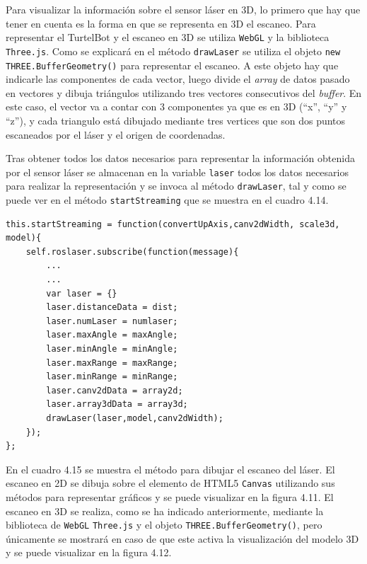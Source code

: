 Para visualizar la información sobre el sensor láser en 3D, lo primero que hay que tener en cuenta es la forma en que se representa en 3D el escaneo. Para representar el TurtelBot y el escaneo en 3D se utiliza \texttt{WebGL} y la biblioteca \texttt{Three.js}. Como se explicará en el método \texttt{drawLaser} se utiliza el objeto \texttt{new THREE.BufferGeometry()} para representar el escaneo. A este objeto hay que indicarle las componentes de cada vector, luego divide el \textit{array} de datos pasado en vectores y dibuja triángulos utilizando tres vectores consecutivos del \textit{buffer}. En este caso, el vector va a contar con 3 componentes ya que es en 3D (``x'', ``y'' y ``z''), y cada triangulo está dibujado mediante tres vertices que son dos puntos escaneados por el láser y el origen de coordenadas.

Tras obtener todos los datos necesarios para representar la información obtenida por el sensor láser se almacenan en la variable \texttt{laser} todos los datos necesarios para realizar la representación y se invoca al método \texttt{drawLaser}, tal y como se puede ver en el método \texttt{startStreaming} que se muestra en el cuadro 4.14.

\begin{lstlisting}[caption= Subscripción y tratamiento del mensaje para su visualización 3D label=cod.subslaser3D]
this.startStreaming = function(convertUpAxis,canv2dWidth, scale3d, model){
	self.roslaser.subscribe(function(message){
		...
		...
		var laser = {}
		laser.distanceData = dist;
		laser.numLaser = numlaser;
		laser.maxAngle = maxAngle;
		laser.minAngle = minAngle;
		laser.maxRange = maxRange;
		laser.minRange = minRange;
		laser.canv2dData = array2d;
		laser.array3dData = array3d;
		drawLaser(laser,model,canv2dWidth);
	});
};
\end{lstlisting}

En el cuadro 4.15 se muestra el método para dibujar el escaneo del láser. El escaneo en 2D se dibuja sobre el elemento de HTML5 \texttt{Canvas} utilizando sus métodos para representar gráficos y se puede visualizar en la figura 4.11. El escaneo en 3D se realiza, como se ha indicado anteriormente, mediante la biblioteca de \texttt{WebGL} \texttt{Three.js} y el objeto \texttt{THREE.BufferGeometry()}, pero únicamente se mostrará en caso de que este activa la visualización del modelo 3D y se puede visualizar en la figura 4.12.


